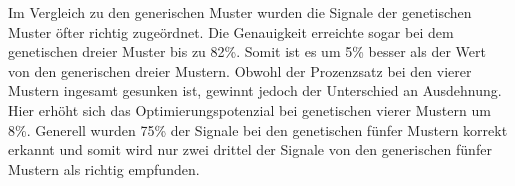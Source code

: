 Im Vergleich zu den generischen Muster wurden die Signale der genetischen Muster {\"o}fter richtig zuge{\"o}rdnet. 
Die Genauigkeit erreichte sogar bei dem genetischen dreier Muster bis zu 82\%. 
Somit ist es um 5\% besser als der Wert von den generischen dreier Mustern.
Obwohl der Prozenzsatz bei den vierer Mustern ingesamt gesunken ist, gewinnt jedoch der Unterschied an Ausdehnung.
Hier erh{\"o}ht sich das Optimierungspotenzial bei genetischen vierer Mustern um 8\%.
Generell wurden 75\% der Signale bei den genetischen f{\"u}nfer Mustern korrekt erkannt und somit wird nur zwei drittel der Signale von den generischen f{\"u}nfer Mustern als richtig empfunden.





